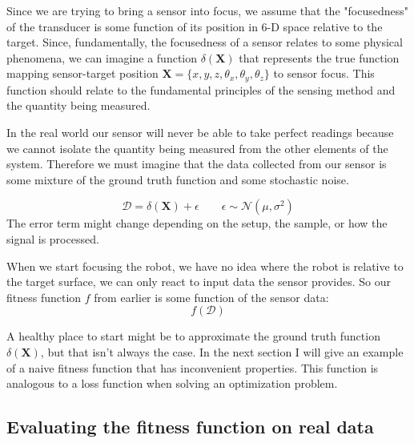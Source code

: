 \documentclass[11pt]{article}
\begin{document}
Since we are trying to bring a sensor into focus, we assume that the "focusedness" of the transducer is some function of its position in 6-D space relative to the target. Since, fundamentally, the focusedness of a sensor relates to some physical phenomena, we can imagine a function $\delta(\mathbf{X})$ that represents the true function mapping sensor-target position $\mathbf{X} = \{x,y,z,\theta_x,\theta_y, \theta_z\}$ to sensor focus.
This function should relate to the fundamental principles of the sensing method and the quantity being measured.

In the real world our sensor will never be able to take perfect readings because we cannot isolate the quantity being measured from the other elements of the system. Therefore we must imagine that the data collected from our sensor is some mixture of the ground truth function and some stochastic noise.

\begin{equation*}
    \mathcal{D} = \delta(\mathbf{X}) + \epsilon \qquad \epsilon \sim \mathcal{N}(\mu, \sigma^2)
\end{equation*}
The error term might change depending on the setup, the sample, or how the signal is processed.

When we start focusing the robot, we have no idea where the robot is relative to the target surface, we can only react to input data the sensor provides. So our fitness function $f$ from earlier is some function of the sensor data:
\begin{equation*}
    f(\mathcal{D})
\end{equation*}

A healthy place to start might be to approximate the ground truth function $\delta(\mathbf{X})$, but that isn't always the case. In the next section I will give an example of a naive fitness function that has inconvenient properties. This function is analogous to a loss function when solving an optimization problem.

\subsection{Evaluating the fitness function on real data}
\end{document}
